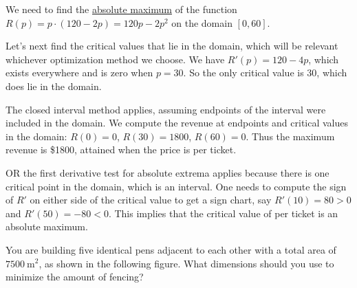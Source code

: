 \documentclass[10pt]{article}
\begin{document}
{\begin{solution}
We need to find the \underline{absolute maximum} of the function $R(p) = p \cdot (120-2p) = 120p - 2p^2$ on the domain $[0,60]$.

Let's next find the critical values that lie in the domain, which will be relevant whichever optimization method we choose.  We have $R'(p) = 120 - 4p$, which exists everywhere and is zero when $p=30$.  So the only critical value is 30, which does lie in the domain.

The closed interval method applies, assuming endpoints of the interval were included in the domain.  We compute the revenue at endpoints and critical values in the domain: $R(0)=0$, $R(30) = 1800$, $R(60)=0$.  Thus the maximum revenue is \$1800, attained when the price is  per ticket.

OR the first derivative test for absolute extrema applies because there is one critical point in the domain, which is an interval.  One needs to compute the sign of $R'$ on either side of the critical value to get a sign chart, say $R'(10) = 80 > 0$ and $R'(50) = -80 < 0$.  This implies that the critical value of  per ticket is an absolute maximum.
\end{solution}
\newpage

\item {}You are building five identical pens adjacent to each other with a
total area of $7500\ \text{m}^2$,
as shown in the following figure.
What dimensions should you use to minimize the amount of fencing?
\begin{center}
\end{center}
}
\end{document}
